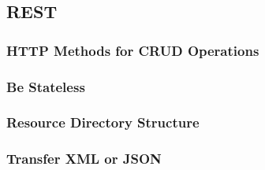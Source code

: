 \subsection{REST}

\subsubsection{HTTP Methods for CRUD Operations}

\subsubsection{Be Stateless}

\subsubsection{Resource Directory Structure}

\subsubsection{Transfer XML or JSON}
